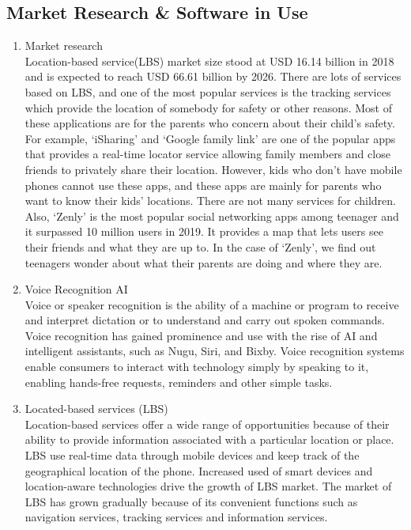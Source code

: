 \documentclass[conference]{IEEEtran}
\begin{document}
\subsection{Market Research \& Software in Use}
\begin{enumerate}
    \item Market research\\
    Location-based service(LBS) market size stood at USD 16.14 billion in 2018 and is expected to reach USD 66.61 billion by 2026. There are lots of services based on LBS, and one of the most popular services is the tracking services which provide the location of somebody for safety or other reasons. Most of these applications are for the parents who concern about their child’s safety. For example, ‘iSharing’ and ‘Google family link’ are one of the popular apps that provides a real-time locator service allowing family members and close friends to privately share their location. However, kids who don’t have mobile phones cannot use these apps, and these apps are mainly for parents who want to know their kids’ locations. There are not many services for children. Also, ‘Zenly’ is the most popular social networking apps among teenager and it surpassed 10 million users in 2019. It provides a map that lets users see their friends and what they are up to. In the case of ‘Zenly’, we find out teenagers wonder about what their parents are doing and where they are.\\
    \item Voice Recognition AI\\
    Voice or speaker recognition is the ability of a machine or program to receive and interpret dictation or to understand and carry out spoken commands. Voice recognition has gained prominence and use with the rise of AI and intelligent assistants, such as Nugu, Siri, and Bixby. Voice recognition systems enable consumers to interact with technology simply by speaking to it, enabling hands-free requests, reminders and other simple tasks. \\
    \item Located-based services (LBS)\\
    Location-based services offer a wide range of opportunities because of their ability to provide information associated with a particular location or place. LBS use real-time data through mobile devices and keep track of the geographical location of the phone. Increased used of smart devices and location-aware technologies drive the growth of LBS market. The market of LBS has grown gradually because of its convenient functions such as navigation services, tracking services and information services. 
\end{enumerate}
\end{document}
